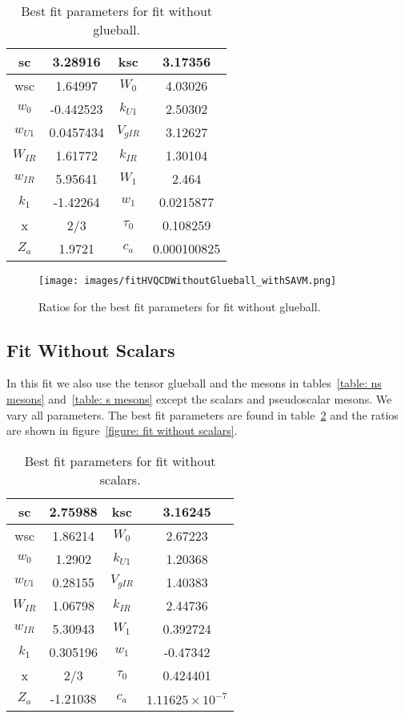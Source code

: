 \documentclass[a4paper,12pt]{article}
\begin{document}
\begin{table}
\centering
\begin{tabular}{ | c | c | c | c |}
\hline
sc & 3.28916 & ksc & 3.17356 \\
\hline
wsc & 1.64997 & $W_0$ & 4.03026 \\
\hline
$w_0$ & -0.442523 & $k_{U1}$ & 2.50302 \\
\hline
$w_{U1}$ & 0.0457434 & $V_{gIR}$ & 3.12627 \\
\hline
$W_{IR}$ & 1.61772 & $k_{IR}$ & 1.30104 \\
\hline
$w_{IR}$ & 5.95641 & $W_1$ & 2.464 \\
\hline
$k_1$ & -1.42264 & $w_1$ & 0.0215877 \\
\hline
x & 2/3 & $\tau_0$ & 0.108259\\
\hline
$Z_a$ & 1.9721 & $c_a$ & 0.000100825\\
\hline
\end{tabular}
\caption{Best fit parameters for fit without glueball.}
\label{table: fit without glueball parameters} 
\end{table}

\begin{figure}
  \center
  \texttt{[image: images/fitHVQCDWithoutGlueball\_withSAVM.png]} 
  \caption{Ratios for the best fit parameters for fit without glueball.}
  \label{figure: fit without glueball}
\end{figure}


\subsection{Fit Without Scalars}

In this fit we also use the tensor glueball and the mesons in tables~\ref{table: ns mesons} and~\ref{table: s mesons} except the scalars and pseudoscalar mesons. We vary all parameters. The best fit parameters are found in table~\ref{table: fit without scalars parameters} and the ratios are shown in figure~\ref{figure: fit without scalars}.

\begin{table}
\centering
\begin{tabular}{ | c | c | c | c |}
\hline
sc & 2.75988 & ksc & 3.16245 \\
\hline
wsc &1.86214 & $W_0$ & 2.67223 \\
\hline
$w_0$ & 1.2902 & $k_{U1}$ & 1.20368 \\
\hline
$w_{U1}$ & 0.28155 & $V_{gIR}$ & 1.40383 \\
\hline
$W_{IR}$ & 1.06798 & $k_{IR}$ & 2.44736 \\
\hline
$w_{IR}$ & 5.30943 & $W_1$ & 0.392724 \\
\hline
$k_1$ & 0.305196 & $w_1$ & -0.47342 \\
\hline
x & 2/3 & $\tau_0$ & 0.424401\\
\hline
$Z_a$ & -1.21038 & $c_a$ & $1.11625 \times 10^{-7}$ \\
\hline
\end{tabular}
\caption{Best fit parameters for fit without scalars.}
\label{table: fit without scalars parameters} 
\end{table}
\end{document}
